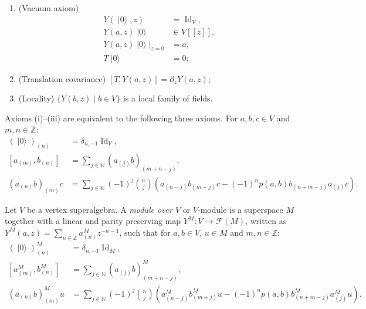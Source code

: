 \documentclass{beamer}
\DeclareMathOperator{\Id}{Id}
\DeclareMathOperator{\vac}{|0\rangle}
\begin{document}
\begin{frame}
  \begin{enumerate}
  \item (Vacuum axiom)
    \begin{align*}
      Y(\vac,z) &= \Id_V, \\
      Y(a, z)\vac &\in V[[z]], \\
      Y(a, z)\vac|_{z = 0} &= a, \\
      T\vac &= 0;
    \end{align*}
  \item (Translation covariance) $[T, Y(a, z)] = \partial_zY(a, z)$;
  \item (Locality) $\{Y(b, z) \mid b \in V\}$ is a local family of fields.
  \end{enumerate}

  Axioms (i)--(iii) are equivalent to the following three axioms.
  For $a, b, c \in V$ and $m, n \in \mathbb{Z}$:
  \begin{align*}
    (\vac)_{(n)} &= \delta_{n, -1}\Id_V, \\
    [a_{(m)}, b_{(n)}] &= \sum_{j \in \mathbb{N}}(a_{(j)}b)_{(m + n - j)}, \\
    (a_{(n)}b)_{(m)}c &= \sum_{j \in \mathbb{N}}(-1)^j\binom{n}{j}(a_{(n - j)}b_{(m + j)}c - (-1)^np(a, b)b_{(n + m - j)}a_{(j)}c).
  \end{align*}
\end{frame}

\begin{frame}
  Let $V$ be a vertex superalgebra.
  A \emph{module over $V$} or $V$-module is a superspace $M$ together with a linear and parity preserving map $Y^M: V \to \mathcal{F}(M)$, written as $Y^M(a, z) = \sum_{n \in \mathbb{Z}}a^M_{(n)}z^{-n - 1}$, such that for $a, b \in V$, $u \in M$ and $m, n \in \mathbb{Z}$:
  \begin{align*}
    (\vac)^M_{(n)} &= \delta_{n, -1}\Id_M, \\
    [a^M_{(m)}, b^M_{(n)}] &= \sum_{j \in \mathbb{N}}(a_{(j)}b)^M_{(m + n - j)}, \\
    (a_{(n)}b)^M_{(m)}u &= \sum_{j \in \mathbb{N}}(-1)^j\binom{n}{j}(a^M_{(n - j)}b^M_{(m + j)}u - (-1)^np(a, b)b^M_{(n + m - j)}a^M_{(j)}u).
  \end{align*}
\end{frame}
\end{document}
